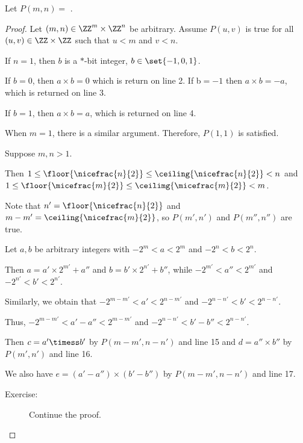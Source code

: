 \documentclass[11pt]{scrartcl}
\begin{document}
Let $P(m, n) = $ .

\begin{proof}
  \hfill

  Let $(m, n) \in \ZZ^m\times \ZZ^n$ be arbitrary. Assume $P(u, v)$ is
  true for all $(u, v) \in\ZZ\times \ZZ$ such that $u<m$ and $v < n$.

  If $n=1$, then $b$ is a $*$-bit integer, $b \in \set{-1, 0, 1}$.

If $b = 0$, then $a\times b = 0$ which is return on line 2. If b$ = - 1$ then $a\times b = -a$, which is returned on line 3. 

If $b=1$, then $a\times b = a$, which is returned on line 4. 

When $m=1$, there is a similar argument. Therefore, $P(1, 1)$ is satisfied.

Suppose $m, n > 1$.

Then $1 \leq \floor{\nicefrac{n}{2}}\leq \ceiling{\nicefrac{n}{2}} < n$ and $1 \leq \floor{\micefrac{m}{2}}\leq \ceilimg{\micefrac{m}{2}} < m$.

Note that $n' = \floor{\nicefrac{n}{2}}$ and $m-m' = \ceiling{\nicefrac{m}{2}}$, so $P(m', n')$ and $P(m'', n'')$ are true.

Let $a, b$ be arbitrary integers with $-2^{m} < a < 2^{m}$ and $-2^{n} <b < 2^n$.

Then $a = a'\times 2^{m'}+a''$ and $b= b'\times 2^{n'}+b''$, while
$-2^{m'}<a''< 2^{m'}$ and $-2^{n'} < b' < 2^{n'}$.

Similarly, we obtain that $-2^{m-m'}< a' < 2^{n-m'}$ and $-2^{n-n'}<b' < 2^{n-n'}$.

Thus, $-2^{m-m'} < a' - a'' < 2 ^{m-m'}$ and
$-2^{n-n'}< b'-b'' < 2^{n-n'} $.

Then $c = a' \timess b'$ by $P(m-m', n-n')$ and line 15 and $d = a''\times b''$ by $P(m', n')$ and line 16.

We also have $e = (a'-a'')\times(b'-b'')$ by $P(m-m', n-n')$ and line 17.

\begin{description}

\item[Exercise:] Continue the proof.

\end{description}
\end{proof}
\end{document}
